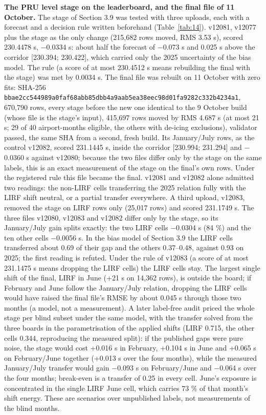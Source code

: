 \documentclass[11pt,a4paper]{article}
\begin{document}
\textbf{The PRU level stage on the leaderboard, and the final file of 11 October.} The stage of Section 3.9 was tested with three uploads, each with a forecast and a decision rule written beforehand (Table~\ref{tab:14}). v12081, v12077 plus the stage as the only change (215,682 rows moved, RMS 3.53 s), scored 230.4478 s, $-$0.0334 s: about half the forecast of $-$0.073 s and 0.025 s above the corridor {[}230.394; 230.422{]}, which carried only the 2025 uncertainty of the bias model. The rule (a score of at most 230.4512 s means rebuilding the final with the stage) was met by 0.0034 s. The final file was rebuilt on 11 October with zero fits: SHA-256 \texttt{bbae2cc544989a0faf68abb85dbb4a9aab5ea38eec98d01fa9282c332b4234a1}, 670,790 rows, every stage before the new one identical to the 9 October build (whose file is the stage's input), 415,697 rows moved by RMS 4.687 s (at most 21 s; 29 of 40 airport-months eligible, the others with de-icing exclusions), validator passed, the same SHA from a second, fresh build. Its January/July rows, as the control v12082, scored 231.1445 s, inside the corridor {[}230.994; 231.294{]} and $-$0.0360 s against v12080; because the two files differ only by the stage on the same labels, this is an exact measurement of the stage on the final's own rows. Under the registered rule this file became the final. v12081 and v12082 alone admitted two readings: the non-LIRF cells transferring the 2025 relation fully with the LIRF shift neutral, or a partial transfer everywhere. A third upload, v12083, removed the stage on LIRF rows only (25,017 rows) and scored 231.1749 s. The three files v12080, v12083 and v12082 differ only by the stage, so its January/July gain splits exactly: the two LIRF cells $-$0.0304 s (84 \%) and the ten other cells $-$0.0056 s. In the bias model of Section 3.9 the LIRF cells transferred about 0.69 of their gap and the others 0.37--0.48, against 0.93 on 2025; the first reading is refuted. Under the rule of v12083 (a score of at most 231.1475 s means dropping the LIRF cells) the LIRF cells stay. The largest single shift of the final, LIRF in June (+21 s on 14,362 rows), is outside the board; if February and June follow the January/July relation, dropping the LIRF cells would have raised the final file's RMSE by about 0.045 s through those two months (a model, not a measurement). A later label-free audit priced the whole stage per blind subset under the same model, with the transfer solved from the three boards in the parametrisation of the applied shifts (LIRF 0.715, the other cells 0.344, reproducing the measured split): if the published gaps were pure noise, the stage would cost +0.016 s in February, +0.104 s in June and +0.065 s on February/June together (+0.013 s over the four months), while the measured January/July transfer would gain $-$0.093 s on February/June and $-$0.064 s over the four months; break-even is a transfer of 0.25 in every cell. June's exposure is concentrated in the single LIRF June cell, which carries 73 \% of that month's shift energy. These are scenarios over unpublished labels, not measurements of the blind months.
\end{document}
